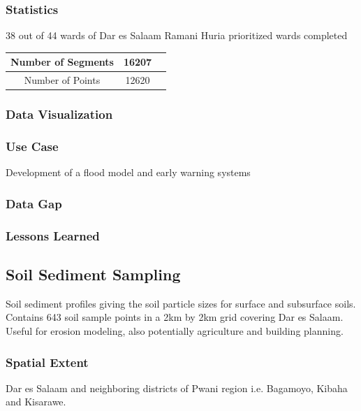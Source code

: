 \documentclass[a4paper,12pt,twoside]{article}
\begin{document}
\subsubsection{Statistics}
38 out of 44 wards of Dar es Salaam Ramani Huria prioritized wards completed
\begin{center}
\begin{tabular}{ |c|c|c| }
 \hline
 Number of Segments & 16207 \\ 
 \hline
 Number of Points & 12620 \\ 
 \hline
\end{tabular}
\end{center}

\subsubsection{Data Visualization}

\subsubsection{Use Case}
Development of a flood model and early warning systems

\subsubsection{Data Gap}

\subsubsection{Lessons Learned}

\newpage
\subsection{Soil Sediment Sampling}

Soil sediment profiles giving the soil particle sizes for surface and subsurface soils. Contains 643 soil sample points in a 2km by 2km grid covering Dar es Salaam.
Useful for erosion modeling, also potentially agriculture and building planning. 

\subsubsection{Spatial Extent}
Dar es Salaam and neighboring districts of Pwani region i.e. Bagamoyo, Kibaha and Kisarawe.
\end{document}
